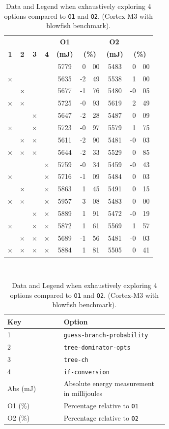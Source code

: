 \documentclass[twocolumn]{article}
\newcommand{\tY}{\checkmark}
\newcommand{\tN}{$\times$}
\begin{document}
\begin{table}
	\centering
	\begin{tabular}{c c c c c r@{.}l c r@{.}l }
		& & & \multicolumn{3}{c}{\hspace{1.5cm}\bfseries O1} & \multicolumn{3}{c}{\hspace{1.3cm}\bfseries O2} \\
		\bfseries 1 & \bfseries 2 & \bfseries 3 & \bfseries 4 & \bfseries (mJ) 	 & \multicolumn{2}{c}{\bfseries (\%)} &
		\bfseries (mJ) 	 & \multicolumn{2}{c}{\bfseries (\%)} \\
		\hline
		\tY&\tY&\tY&\tY& 5779 & 0&00 	&  5483 &  0&00\\
		\tN&\tY&\tY&\tY& 5635 & -2&49 	&  5538 &  1&00\\
		\tY&\tN&\tY&\tY& 5677 & -1&76 	&  5480 & -0&05\\
		\tN&\tN&\tY&\tY& 5725 & -0&93 	&  5619 &  2&49\\
		\tY&\tY&\tN&\tY& 5647 & -2&28 	&  5487 &  0&09\\
		\tN&\tY&\tN&\tY& 5723 & -0&97 	&  5579 &  1&75\\
		\tY&\tN&\tN&\tY& 5611 & -2&90 	&  5481 &  -0&03\\
		\tN&\tN&\tN&\tY& 5644 & -2&33 	&  5529 &  0&85\\

		\tY&\tY&\tY&\tN& 5759 & -0&34 	&  5459 &  -0&43\\
		\tN&\tY&\tY&\tN& 5716 & -1&09 	&  5484 &  0&03\\
		\tY&\tN&\tY&\tN& 5863 & 1&45 	&  5491 &  0&15\\
		\tN&\tN&\tY&\tN& 5957 & 3&08 	&  5483 &  0&00\\
		\tY&\tY&\tN&\tN& 5889 & 1&91 	&  5472 &  -0&19\\
		\tN&\tY&\tN&\tN& 5872 & 1&61 	&  5569 &  1&57\\
		\tY&\tN&\tN&\tN& 5689 & -1&56 	&  5481 &  -0&03\\
		\tN&\tN&\tN&\tN& 5884 & 1&81 	&  5505 &  0&41\\
	\end{tabular}\\[1em]

	\begin{tabular}{l p{0.65\linewidth}}
		\bfseries Key & \bfseries Option \\
		\hline
		1 & \texttt{guess-branch-probability}  \\
		2 & \texttt{tree-dominator-opts}  \\
		3 & \texttt{tree-ch} \\
		4 & \texttt{if-conversion} \\
		Abs (mJ) & Absolute energy measurement in millijoules \\
		O1 (\%) & Percentage relative to \texttt{O1} \\
		O2 (\%) & Percentage relative to \texttt{O2} \\
	\end{tabular}
	\caption{Data and Legend when exhaustively exploring 4 options compared to \texttt{O1} and \texttt{O2}. (Cortex-M3 with blowfish benchmark).}
	\label{Table:Exhaustive}
\end{table}
\end{document}

